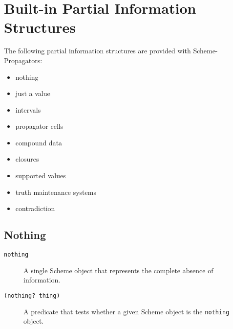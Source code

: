 \documentclass[12pt,letterpaper,english]{article}
\begin{document}

\hypertarget{built-in-partial-information-structures}{}
\section{Built-in Partial Information Structures}
\label{built-in-partial-information-structures}

The following partial information structures are provided with
Scheme-Propagators:
\begin{itemize}
\item {} 
nothing

\item {} 
just a value

\item {} 
intervals

\item {} 
propagator cells

\item {} 
compound data

\item {} 
closures

\item {} 
supported values

\item {} 
truth maintenance systems

\item {} 
contradiction

\end{itemize}



\hypertarget{nothing}{}
\subsection{Nothing}
\label{nothing}
\begin{description}
\item[{\texttt{nothing}}] \leavevmode 
A single Scheme object that represents the complete absence of
information.

\item[{\texttt{(nothing? thing)}}] \leavevmode 
A predicate that tests whether a given Scheme object is the \texttt{nothing}
object.

\end{description}
\end{document}
